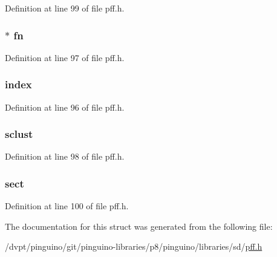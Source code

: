 Definition at line 99 of file pff.\-h.

\hypertarget{struct___d_i_r___a4d44c37d88411bd5e8b490d823bb7f41}{
\subsubsection[{fn}]{$\ast$ fn}}\label{struct___d_i_r___a4d44c37d88411bd5e8b490d823bb7f41}


Definition at line 97 of file pff.\-h.

\hypertarget{struct___d_i_r___aceac89c5a3f513fbaf0d24a293ccb75c}{
\subsubsection[{index}]{ index}}\label{struct___d_i_r___aceac89c5a3f513fbaf0d24a293ccb75c}


Definition at line 96 of file pff.\-h.

\hypertarget{struct___d_i_r___aada1acd6ce100ead798e712b18c49547}{
\subsubsection[{sclust}]{ sclust}}\label{struct___d_i_r___aada1acd6ce100ead798e712b18c49547}


Definition at line 98 of file pff.\-h.

\hypertarget{struct___d_i_r___a516c42b11207c2945dbf307809554d62}{
\subsubsection[{sect}]{ sect}}\label{struct___d_i_r___a516c42b11207c2945dbf307809554d62}


Definition at line 100 of file pff.\-h.



The documentation for this struct was generated from the following file\-:\begin{DoxyCompactItemize}
\item 
/dvpt/pinguino/git/pinguino-\/libraries/p8/pinguino/libraries/sd/\hyperlink{pff_8h}{pff.\-h}\end{DoxyCompactItemize}
